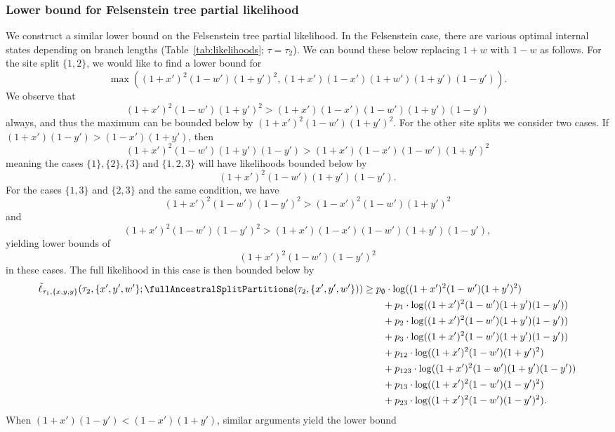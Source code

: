 \subsubsection{Lower bound for Felsenstein tree partial likelihood}

We construct a similar lower bound on the Felsenstein tree partial likelihood.
In the Felsenstein case, there are various optimal internal states depending on branch lengths (Table~\ref{tab:likelihoods}; $\tau = \tau_2$).
We can bound these below replacing $1+w$ with $1-w$ as follows.
For the site split $\{1,2\}$, we would like to find a lower bound for
$$
\max\left((1+x')^2 (1-w')(1+y')^2, (1+x')(1-x')(1+w')(1+y')(1-y')\right).
$$
We observe that
$$
(1+x')^2 (1-w')(1+y')^2 > (1+x')(1-x')(1-w')(1+y')(1-y')
$$
always, and thus the maximum can be bounded below by $(1+x')^2 (1-w')(1+y')^2$.
For the other site splits we consider two cases.
If $(1+x')(1-y') > (1-x')(1+y')$, then
$$
(1+x')^2(1-w')(1+y')(1-y') > (1+x')(1-x')(1-w')(1+y')^2
$$
meaning the cases $\{1\}, \{2\}, \{3\}$ and $\{1,2,3\}$ will have likelihoods bounded below by
$$
(1+x')^2(1-w')(1+y')(1-y').
$$
For the cases $\{1,3\}$ and $\{2,3\}$ and the same condition, we have
$$
(1+x')^2(1-w')(1-y')^2 > (1-x')^2(1-w')(1+y')^2
$$
and
$$
(1+x')^2(1-w')(1-y')^2 > (1+x')(1-x')(1-w')(1+y')(1-y'),
$$
yielding lower bounds of
$$
(1+x')^2(1-w')(1-y')^2
$$
in these cases.
The full likelihood in this case is then bounded below by
\begin{align*}
    \tilde{\ell}_{\tau_1,\{x,y,y\}}(\tau_2, \{x',y',w'\}; \fullAncestralSplitPartitions(\tau_2,\{x',y',w'\}))
    &\ge      p_{\emptyset}  \cdot\log((1+x')^2   (1-w')(1+y')^2) \\
    &\qquad + p_{1}          \cdot\log((1+x')^2   (1-w')(1+y')(1-y')) \\
    &\qquad + p_{2}          \cdot\log((1+x')^2   (1-w')(1+y')(1-y')) \\
    &\qquad + p_{3}          \cdot\log((1+x')^2   (1-w')(1+y')(1-y')) \\
    &\qquad + p_{12}         \cdot\log((1+x')^2   (1-w')(1+y')^2) \\
    &\qquad + p_{123}        \cdot\log((1+x')^2   (1-w')(1+y')(1-y'))\\
    &\qquad + p_{13}         \cdot\log((1+x')^2   (1-w')(1-y')^2) \\
    &\qquad + p_{23}         \cdot\log((1+x')^2   (1-w')(1-y')^2).
\end{align*}
When $(1+x')(1-y') < (1-x')(1+y')$, similar arguments yield the lower bound
